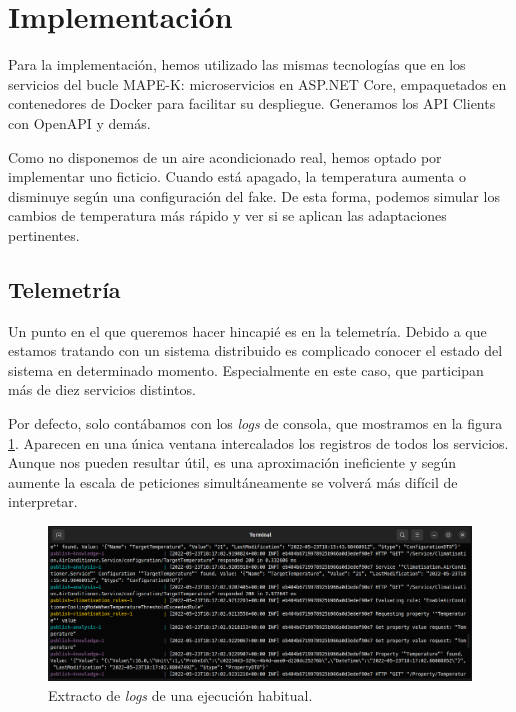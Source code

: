 \section{Implementación}

Para la implementación, hemos utilizado las mismas tecnologías que en los servicios del bucle MAPE-K: microservicios en ASP.NET Core, empaquetados en contenedores de Docker para facilitar su despliegue. Generamos los API Clients con OpenAPI y demás.

Como no disponemos de un aire acondicionado real, hemos optado por implementar uno ficticio. Cuando está apagado, la temperatura aumenta o disminuye según una configuración del fake. De esta forma, podemos simular los cambios de temperatura más rápido y ver si se aplican las adaptaciones pertinentes.

\subsection{Telemetría}

Un punto en el que queremos hacer hincapié es en la telemetría. Debido a que estamos tratando con un sistema distribuido es complicado conocer el estado del sistema en determinado momento. Especialmente en este caso, que participan más de diez servicios distintos.

Por defecto, solo contábamos con los \emph{logs} de consola, que mostramos en la figura \ref{fig:console-logs}. Aparecen en una única ventana intercalados los registros de todos los servicios. Aunque nos pueden resultar útil, es una aproximación ineficiente y según aumente la escala de peticiones simultáneamente se volverá más difícil de interpretar.

\begin{figure}[h]
  \centering
  \includegraphics[scale=1.45]{cap_caso-estudio/images/console-logs}
  \caption{Extracto de \emph{logs} de una ejecución habitual.}
  \label{fig:console-logs}
\end{figure}

